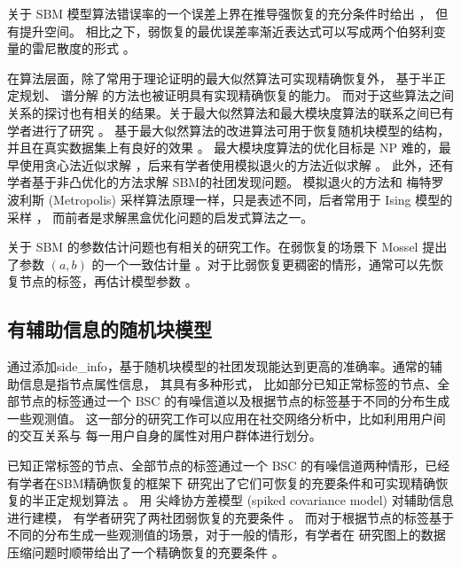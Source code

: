 关于 SBM 模型算法错误率的一个误差上界在推导强恢复的充分条件时给出 \cite{abbe2015exact}，
但有提升空间。
相比之下，弱恢复的最优误差率渐近表达式可以写成两个伯努利变量的雷尼散度的形式 \cite{zhang2016}。

在算法层面，除了常用于理论证明的最大似然算法可实现精确恢复外，
基于半正定规划\cite{hajek2016achieving}、
谱分解\cite{Yun2014} 的方法也被证明具有实现精确恢复的能力。
而对于这些算法之间关系的探讨也有相关的结果。关于最大似然算法和最大模块度算法的联系之间已有学者进行了研究 \cite{newman2016equivalence}。
基于最大似然算法的改进算法可用于恢复随机块模型的结构，并且在真实数据集上有良好的效果
\cite{karrer2011stochastic}。
最大模块度算法的优化目标是 NP 难的，最早使用贪心法近似求解 \cite{clauset2004finding}，后来有学者使用模拟退火的方法近似求解 \cite{he2016fast}。
此外，还有学者基于非凸优化的方法求解 SBM的社团发现问题\cite{wang2021non}。
模拟退火的方法和 梅特罗波利斯 (Metropolis) 采样算法原理一样，只是表述不同，后者常用于 Ising 模型的采样 \cite{metropolis1953equation}，
而前者是求解黑盒优化问题的启发式算法之一。



关于 SBM 的参数估计问题也有相关的研究工作。在弱恢复的场景下 Mossel 提出了参数 $(a,b)$ 的一个一致估计量
\cite{mossel2015reconstruction}。对于比弱恢复更稠密的情形，通常可以先恢复节点的标签，再估计模型参数
\cite{abbe2015recovering}。

\subsection{有辅助信息的随机块模型}
通过添加\gls{side_info}，基于随机块模型的社团发现能达到更高的准确率。通常的辅助信息是指节点属性信息\cite{1021723343.nh}，
其具有多种形式，
比如部分已知正常标签的节点、全部节点的标签通过一个 BSC 的有噪信道以及根据节点的标签基于不同的分布生成一些观测值\cite{saad2018community}。
这一部分的研究工作可以应用在社交网络分析中，比如利用用户间的交互关系与
每一用户自身的属性对用户群体进行划分。

已知正常标签的节点、全部节点的标签通过一个 BSC 的有噪信道两种情形，已经有学者在SBM精确恢复的框架下
研究出了它们可恢复的充要条件和可实现精确恢复的半正定规划算法 \cite{esmaeili2019community, esmaeili2019exact}。
用 尖峰协方差模型 (spiked covariance model) 对辅助信息
进行建模，
有学者研究了两社团弱恢复的充要条件 \cite{deshpande2018contextual}。
而对于根据节点的标签基于不同的分布生成一些观测值的场景，对于一般的情形，有学者在
研究图上的数据压缩问题时顺带给出了一个精确恢复的充要条件 \cite{abbe17sideinfo}。

